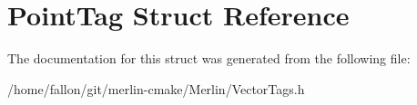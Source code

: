 \hypertarget{structPointTag}{}\section{Point\+Tag Struct Reference}
\label{structPointTag}


The documentation for this struct was generated from the following file\+:\begin{DoxyCompactItemize}
\item 
/home/fallon/git/merlin-\/cmake/\+Merlin/Vector\+Tags.\+h\end{DoxyCompactItemize}
